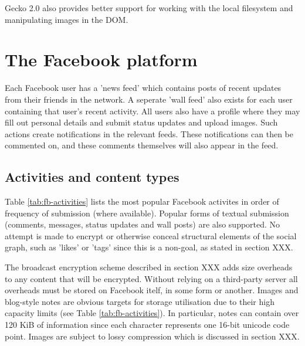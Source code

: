 Gecko 2.0 also provides better support for working with the local filesystem and manipulating images in the \ac{DOM}.


\section{The Facebook platform}

Each Facebook user has a 'news feed' which contains posts of recent updates from their friends in the network. A seperate 'wall feed' also exists for each user containing that user's recent activity. All users also have a profile where they may fill out personal details and submit status updates and upload images. Such actions create notifications in the relevant feeds. These notifications can then be commented on, and these comments themselves will also appear in the feed.

\subsection{Activities and content types}

Table \ref{tab:fb-activities} lists the most popular Facebook activites in order of frequency of submission (where available).  Popular forms of textual submission (comments, messages, status updates and wall posts) are also supported. No attempt is made to encrypt or otherwise conceal structural elements of the social graph, such as 'likes' or 'tags' since this is a non-goal, as stated in section XXX. 

The broadcast encryption scheme described in section XXX adds size overheads to any content that will be encrypted. Without relying on a third-party server all overheads must be stored on Facebook itelf, in some form or another. Images and blog-style notes are obvious targets for storage utilisation due to their high capacity limits (see Table \ref{tab:fb-activities}). In particular, notes can contain over 120 KiB of information since each character represents one 16-bit unicode code point. Images are subject to lossy compression which is discussed in section XXX.

